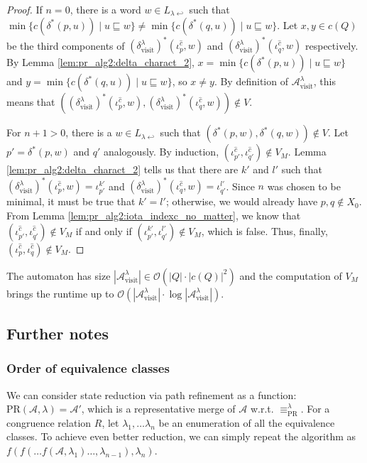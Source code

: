 \begin{proof}
	If $n = 0$, there is a word $w \in L_{\lambda \hookleftarrow}$ such that $\min \{c(\delta^*(p, u)) \mid u \sqsubseteq w\} \neq \min \{c(\delta^*(q, u)) \mid u \sqsubseteq w\}$. Let $x, y \in c(Q)$ be the third components of $(\delta^\lambda_\text{visit})^*(\iota_p^{\hat{c}}, w)$ and $(\delta^\lambda_\text{visit})^*(\iota_q^{\hat{c}}, w)$ respectively. By Lemma \ref{lem:pr_alg2:delta_charact_2}, $x = \min \{c(\delta^*(p, u)) \mid u \sqsubseteq w\}$ and $y = \min \{c(\delta^*(q, u)) \mid u \sqsubseteq w\}$, so $x \neq y$. By definition of $\mathcal{A}^\lambda_\text{visit}$, this means that $((\delta^\lambda_\text{visit})^*(\iota_p^{\hat{c}}, w), (\delta^\lambda_\text{visit})^*(\iota_q^{\hat{c}}, w)) \notin V$.
	
	For $n+1 > 0$, there is a $w \in L_{\lambda \hookleftarrow}$ such that $(\delta^*(p, w), \delta^*(q, w)) \notin V$. Let $p' = \delta^*(p, w)$ and $q'$ analogously. By induction, $(\iota_{p'}^{\hat{c}}, \iota_{q'}^{\hat{c}}) \notin V_M$. Lemma \ref{lem:pr_alg2:delta_charact_2} tells us that there are $k'$ and $l'$ such that $(\delta^\lambda_\text{visit})^*(\iota_p^{\hat{c}}, w) = \iota_{p'}^{k'}$ and $(\delta^\lambda_\text{visit})^*(\iota_q^{\hat{c}}, w) = \iota_{q'}^{l'}$. Since $n$ was chosen to be minimal, it must be true that $k' = l'$; otherwise, we would already have $p, q \notin X_0$. From Lemma \ref{lem:pr_alg2:iota_indexc_no_matter}, we know that $(\iota_{p'}^{\hat{c}}, \iota_{q'}^{\hat{c}}) \notin V_M$ if and only if $(\iota_{p'}^{k'}, \iota_{q'}^{l'}) \notin V_M$, which is false. Thus, finally, $(\iota_p^{\hat{c}}, \iota_q^{\hat{c}}) \notin V_M$.
\end{proof}

The automaton has size $|\mathcal{A}^\lambda_\text{visit}| \in \mathcal{O}(|Q| \cdot |c(Q)|^2)$ and the computation of $V_M$ brings the runtime up to $\mathcal{O}(|\mathcal{A}^\lambda_\text{visit}| \cdot \log |\mathcal{A}^\lambda_\text{visit}|)$.





\subsection{Further notes}
\subsubsection{Order of equivalence classes}
We can consider state reduction via path refinement as a function: $\text{PR}(\mathcal{A}, \lambda) = \mathcal{A}'$, which is a representative merge of $\mathcal{A}$ w.r.t. $\equiv_\text{PR}^\lambda$. For a congruence relation $R$, let $\lambda_1, \dots \lambda_n$ be an enumeration of all the equivalence classes. To achieve even better reduction, we can simply repeat the algorithm as $f(f(\dots f(\mathcal{A}, \lambda_1) \dots , \lambda_{n-1}), \lambda_n)$.

